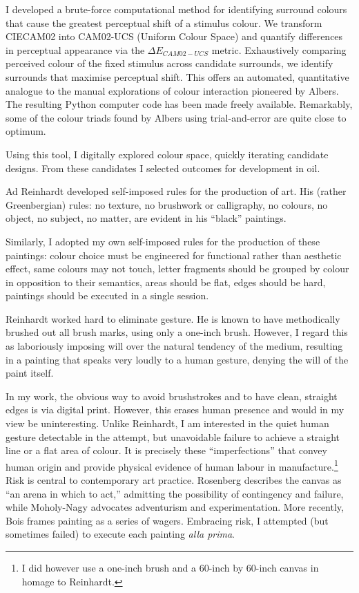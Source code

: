 \documentclass[12pt]{article}
\begin{document}
I developed a brute-force computational method for identifying
surround colours that cause the greatest perceptual shift of a
stimulus colour. We transform CIECAM02 into CAM02-UCS (Uniform Colour
Space) and quantify differences in perceptual appearance via the
$\Delta E_{CAM02-UCS}$ metric. Exhaustively comparing perceived colour
of the fixed stimulus across candidate surrounds, we identify
surrounds that maximise perceptual shift. This offers an automated,
quantitative analogue to the manual explorations of colour interaction
pioneered by Albers.\autocite{albers} The resulting Python computer code
has been made freely
available.\autocite{grant2025colourshift} Remarkably, some of the colour
triads found by Albers using trial-and-error are quite close to
optimum.

Using this tool, I digitally explored colour space, quickly iterating
candidate designs. From these candidates I selected outcomes for
development in oil.

Ad Reinhardt developed self-imposed rules for the production of
art.\autocite[pp.~203--207]{artasart} His (rather Greenbergian) rules: no
texture, no brushwork or calligraphy, no colours, no object, no
subject, no matter, are evident in his ``black'' paintings.

Similarly, I adopted my own self-imposed rules for the production of
these paintings: colour choice must be engineered for functional
rather than aesthetic effect, same colours may not touch, letter
fragments should be grouped by colour in opposition to their
semantics, areas should be flat, edges should be hard, paintings
should be executed in a single session.

Reinhardt worked hard to eliminate gesture. He is known to have
methodically brushed out all brush marks, using only a one-inch
brush.\autocite[p.~206]{artasart} However, I regard this as 
laboriously imposing will over the natural tendency of the medium,
resulting in a painting that speaks very loudly to a human gesture,
denying the will of the paint itself.

In my work, the obvious way to avoid brushstrokes and to have clean,
straight edges is via digital print. However, this erases human
presence and would in my view be uninteresting. Unlike Reinhardt, I am
interested in the quiet human gesture detectable in the attempt, but
unavoidable failure to achieve a straight line or a flat area of
colour. It is precisely these ``imperfections'' that convey human
origin and provide physical evidence of human labour in
manufacture.\footnote{I did however use a one-inch brush and a 60-inch
  by 60-inch canvas in homage to Reinhardt.} Risk is central to
contemporary art practice. Rosenberg describes the canvas as ``an
arena in which to act,''\autocite[p.~22]{rosenberg1952american} admitting
the possibility of contingency and failure, while Moholy-Nagy
advocates adventurism and
experimentation.\autocite[pp.~274--276]{moholy1947vision} More recently, Bois
frames painting as a series of wagers.\autocite[p.~229]{bois1990painting}
Embracing risk, I attempted (but sometimes failed) to execute each
painting \emph{alla prima}.
\end{document}
